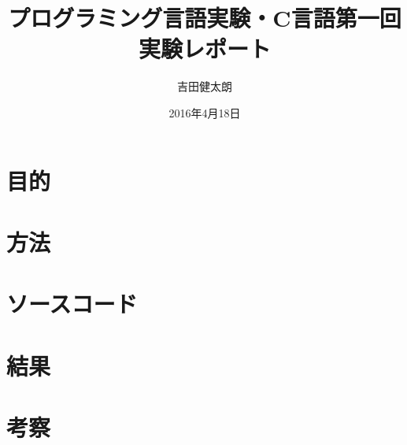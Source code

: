 \documentclass[a4j]{jarticle}
\date{2016年4月18日}
\author{吉田健太朗}
\title{プログラミング言語実験・C言語第一回実験レポート}
\begin{document}
\maketitle

\section{目的}


\section{方法}

\section{ソースコード}


\section{結果}


\section{考察}

\end{document}
